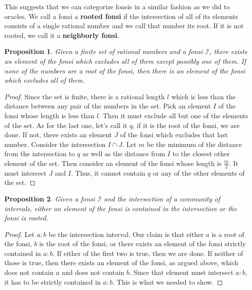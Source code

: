 \documentclass[12pt]{article}
\newtheorem{proposition}{Proposition}[subsection]
\begin{document}
This suggests that we can categorize fonsis in a similar fashion as we did to oracles. We call a fonsi a \textbf{rooted fonsi} if the intersection of all of its elements consists of a single rational number and we call that number its root. If it is not rooted, we call it a \textbf{neighborly fonsi}. 

\begin{proposition}
    Given a finite set of rational numbers and a fonsi $\mathcal{I}$, there exists an element of the fonsi which excludes all of them except possibly one of them. If none of the numbers are a root of the fonsi, then there is an element of the fonsi which excludes all of them. 
\end{proposition}

\begin{proof}
    Since the set is finite, there is a rational length $l$ which is less than the distance between any pair of the numbers in the set. Pick an element $I$ of the fonsi whose length is less than $l$. Then it must exclude all but one of the elements of the set. As for the last one, let's call it $q$, if it is the root of the fonsi, we are done. If not, there exists an element $J$ of the fonsi which excludes that last number. Consider the intersection $I \cap J$. Let $m$ be the minimum of the distance from the intersection to $q$ as well as the distance from $I$ to the closest other element of the set. Then consider an element of the fonsi whose length is $\frac{m}{2}$. It must intersect $J$ and $I$. Thus, it cannot contain $q$ or any of the other elements of the set. 
\end{proof}


\begin{proposition}\label{pr:fonsi-contain}
    Given a fonsi $\mathcal{I}$ and the intersection of a community of intervals, either an element of the fonsi is contained in the intersection or the fonsi is rooted. 
\end{proposition}

\begin{proof}
    Let $a:b$ be the intersection interval. Our claim is that either $a$ is a root of the fonsi, $b$ is the root of the fonsi, or there exists an element of the fonsi strictly contained in $a:b$. If either of the first two is true, then we are done. If neither of those is true, then there exists an element of the fonsi, as argued above, which does not contain $a$ and does not contain $b$. Since that element must intersect $a:b$, it has to be strictly contained in $a:b$. This is what we needed to show. 
\end{proof}
\end{document}
